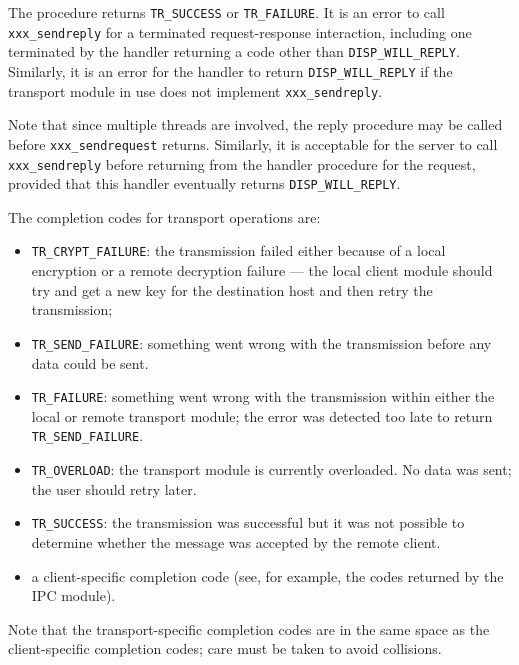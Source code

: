 The procedure returns \verb"TR_SUCCESS" or \verb"TR_FAILURE". It is an
error to call \verb"xxx_sendreply" for a terminated request-response interaction,
including one terminated by the handler returning a code other than
\verb"DISP_WILL_REPLY". Similarly, it is an error for the handler to
return \verb"DISP_WILL_REPLY" if the transport module in use does not
implement \verb"xxx_sendreply".

\begin{sloppypar}
Note that since multiple threads are involved, the reply
procedure may be called before \verb"xxx_sendrequest" returns.
Similarly, it is acceptable for the server to call
\verb"xxx_sendreply" before returning from the handler procedure for
the request, provided that this handler eventually returns
\verb"DISP_WILL_REPLY". 
\end{sloppypar}

The completion codes for transport operations are:
\begin{itemize}
\item \verb"TR_CRYPT_FAILURE": the transmission failed either because of a
local encryption or a remote decryption failure --- the local client module
should try and get a new key for the destination host and then retry the
transmission;

\item \verb"TR_SEND_FAILURE": something went wrong with the
transmission before any data could be sent.

\item \verb"TR_FAILURE": something went wrong with the transmission within
either the local or remote transport module; the error was detected
too late to return \verb"TR_SEND_FAILURE".

\item \verb"TR_OVERLOAD": the transport module is currently
overloaded. No data was sent; the user should retry later.

\item \verb"TR_SUCCESS": the transmission was successful but it was not
possible to determine whether the message was accepted by the remote client.

\item a client-specific completion code (see, for example, the codes
returned by the IPC module).
\end{itemize}
Note that the transport-specific completion codes are in the same
space as the client-specific completion codes; care must be taken to
avoid collisions.

